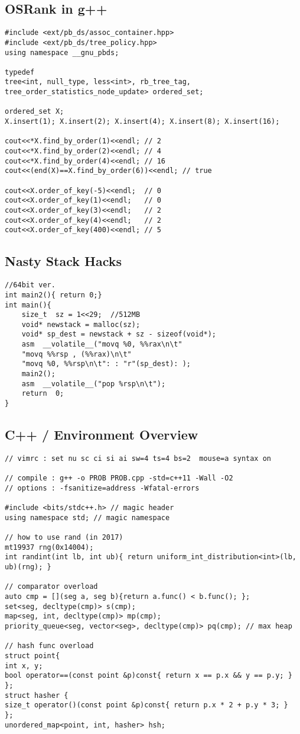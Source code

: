 \documentclass[landscape, 8pt, a4paper, oneside,  twocolumn]{extarticle}
\begin{document}
\subsection {OSRank in g++}
\begin{verbatim}
#include <ext/pb_ds/assoc_container.hpp> 
#include <ext/pb_ds/tree_policy.hpp> 
using namespace __gnu_pbds; 

typedef
tree<int, null_type, less<int>, rb_tree_tag, tree_order_statistics_node_update> ordered_set;

ordered_set X;
X.insert(1); X.insert(2); X.insert(4); X.insert(8); X.insert(16);

cout<<*X.find_by_order(1)<<endl; // 2
cout<<*X.find_by_order(2)<<endl; // 4
cout<<*X.find_by_order(4)<<endl; // 16
cout<<(end(X)==X.find_by_order(6))<<endl; // true

cout<<X.order_of_key(-5)<<endl;  // 0
cout<<X.order_of_key(1)<<endl;   // 0
cout<<X.order_of_key(3)<<endl;   // 2
cout<<X.order_of_key(4)<<endl;   // 2
cout<<X.order_of_key(400)<<endl; // 5
\end{verbatim}

\subsection {Nasty Stack Hacks}
\begin{verbatim}
//64bit ver.
int main2(){ return 0;}
int main(){
	size_t  sz = 1<<29;  //512MB
	void* newstack = malloc(sz);
	void* sp_dest = newstack + sz - sizeof(void*);
	asm  __volatile__("movq %0, %%rax\n\t"
	"movq %%rsp , (%%rax)\n\t"
	"movq %0, %%rsp\n\t": : "r"(sp_dest): );
	main2();
	asm  __volatile__("pop %rsp\n\t");
	return  0;
}
\end{verbatim}

\subsection {C++ / Environment Overview}
\begin{verbatim}	
// vimrc : set nu sc ci si ai sw=4 ts=4 bs=2  mouse=a syntax on

// compile : g++ -o PROB PROB.cpp -std=c++11 -Wall -O2
// options : -fsanitize=address -Wfatal-errors

#include <bits/stdc++.h> // magic header
using namespace std; // magic namespace

// how to use rand (in 2017)
mt19937 rng(0x14004);
int randint(int lb, int ub){ return uniform_int_distribution<int>(lb, ub)(rng); }

// comparator overload
auto cmp = [](seg a, seg b){return a.func() < b.func(); };
set<seg, decltype(cmp)> s(cmp); 
map<seg, int, decltype(cmp)> mp(cmp);
priority_queue<seg, vector<seg>, decltype(cmp)> pq(cmp); // max heap

// hash func overload
struct point{
int x, y;
bool operator==(const point &p)const{ return x == p.x && y == p.y; }
};
struct hasher {
size_t operator()(const point &p)const{ return p.x * 2 + p.y * 3; }
};
unordered_map<point, int, hasher> hsh;

\end{verbatim}
\end{document}
